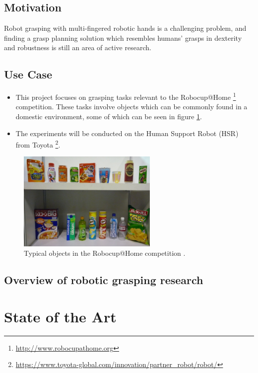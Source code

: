 \documentclass[runningheads]{../llncs}
\begin{document}
\subsection{Motivation}

Robot grasping with multi-fingered robotic hands is a challenging problem, and finding a grasp planning solution which
resembles humans' grasps in dexterity and robustness is still an area of active research.

\subsection{Use Case}

\begin{itemize}
    \item This project focuses on grasping tasks relevant to the Robocup@Home
            \footnote{\url{http://www.robocupathome.org}} competition. These tasks involve objects which can be commonly
            found in a domestic environment, some of which can be seen in figure \ref{fig:robocup_objects}.
    \item The experiments will be conducted on the Human Support Robot (HSR) from Toyota
            \footnote{\url{https://www.toyota-global.com/innovation/partner_robot/robot/}}.
\end{itemize}

\begin{figure}[h!]
    \centering
    \includegraphics[width=0.6\textwidth]{robocup_typical_objects}
    \caption{Typical objects in the Robocup@Home competition \cite{robocupRulebook2018}.}
    \label{fig:robocup_objects}
\end{figure}

\subsection{Overview of robotic grasping research}

\section{State of the Art}
\end{document}
